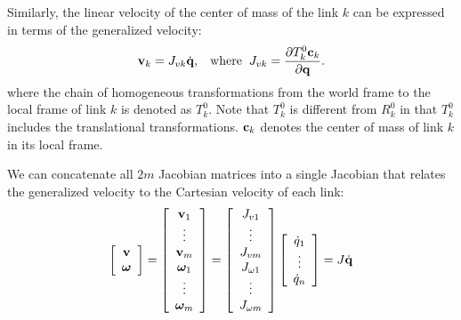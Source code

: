 
Similarly, the linear velocity of the center of mass of the link $k$
can be expressed in terms of the generalized velocity: 
\begin{equation}
\mathbf{v}_k = J_{vk} \dot{\mathbf{q}}, \;\;\;\mathrm{where}\;\; J_{vk} = \frac{\partial T^0_k
  \mathbf{c}_k}{\partial \mathbf{q}}.
\end{equation}
where the chain of homogeneous transformations from the world frame to the local
frame of link $k$ is denoted as $T^0_k$. Note that $T^0_k$ is
different from $R^0_k$ in that $T^0_k$ includes the translational
transformations. $\mathbf{c}_k$ denotes the center of mass of link $k$ in
its local frame.


We can concatenate all $2m$  Jacobian matrices into a single Jacobian
that relates the generalized velocity to the Cartesian velocity of each
link:
\begin{equation}
\left[
\begin{array}{c}
\mathbf{v} \\
\bm{\omega} \\
\end{array}
\right] =
\left[
\begin{array}{c}
\mathbf{v}_1 \\
\vdots \\
\mathbf{v}_m \\
\bm{\omega}_1 \\
\vdots \\
\bm{\omega}_m
\end{array}
\right] = 
\left[
\begin{array}{c}
J_{v1} \\
\vdots \\
J_{vm} \\
J_{\omega 1} \\
\vdots \\
J_{\omega m}
\end{array}
\right] 
\left[
\begin{array}{c}
\dot{q}_1\\
\vdots \\
\dot{q}_n
\end{array}
\right]  = J \dot{\mathbf{q}}
\end{equation}

